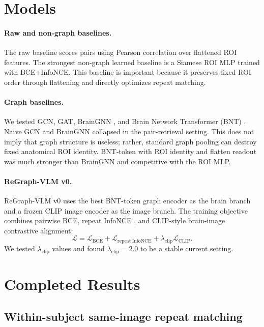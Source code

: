 \documentclass{article}
\begin{document}
\section{Models}

\paragraph{Raw and non-graph baselines.}
The raw baseline scores pairs using Pearson correlation over flattened ROI features. The strongest non-graph learned baseline is a Siamese ROI MLP trained with BCE+InfoNCE. This baseline is important because it preserves fixed ROI order through flattening and directly optimizes repeat matching.

\paragraph{Graph baselines.}
We tested GCN, GAT, BrainGNN \citep{li2021braingnn}, and Brain Network Transformer (BNT) \citep{kan2022bnt}. Naive GCN and BrainGNN collapsed in the pair-retrieval setting. This does not imply that graph structure is useless; rather, standard graph pooling can destroy fixed anatomical ROI identity. BNT-token with ROI identity and flatten readout was much stronger than BrainGNN and competitive with the ROI MLP.

\paragraph{ReGraph-VLM v0.}
ReGraph-VLM v0 uses the best BNT-token graph encoder as the brain branch and a frozen CLIP image encoder \citep{radford2021clip} as the image branch. The training objective combines pairwise BCE, repeat InfoNCE \citep{oord2018infonce}, and CLIP-style brain-image contrastive alignment:
\begin{equation}
  \mathcal{L} = \mathcal{L}_{\mathrm{BCE}} + \mathcal{L}_{\mathrm{repeat\ InfoNCE}} + \lambda_{\mathrm{clip}}\mathcal{L}_{\mathrm{CLIP}}.
\end{equation}
We tested $\lambda_{\mathrm{clip}}$ values and found $\lambda_{\mathrm{clip}}=2.0$ to be a stable current setting.

\section{Completed Results}

\subsection{Within-subject same-image repeat matching}
\end{document}
